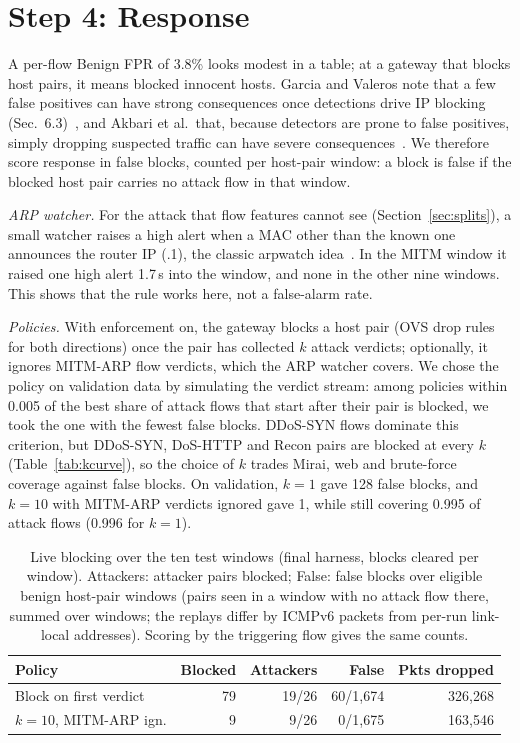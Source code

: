\section{Step 4: Response}\label{sec:response}

A per-flow Benign FPR of 3.8\% looks modest in a table; at a gateway that blocks host pairs, it means blocked innocent hosts. Garcia and Valeros note that a few false positives can have strong consequences once detections drive IP blocking (Sec.~6.3)~\cite{garcia2023labeling}, and Akbari et al.\ that, because detectors are prone to false positives, simply dropping suspected traffic can have severe consequences~\cite{akbari2020atmos}. We therefore score response in false blocks, counted per host-pair window: a block is false if the blocked host pair carries no attack flow in that window.

\emph{ARP watcher.} For the attack that flow features cannot see (Section~\ref{sec:splits}), a small watcher raises a high alert when a MAC other than the known one announces the router IP (.1), the classic arpwatch idea~\cite{arpwatch}. In the MITM window it raised one high alert 1.7\,s into the window, and none in the other nine windows. This shows that the rule works here, not a false-alarm rate.

\emph{Policies.} With enforcement on, the gateway blocks a host pair (OVS drop rules for both directions) once the pair has collected $k$ attack verdicts; optionally, it ignores MITM-ARP flow verdicts, which the ARP watcher covers. We chose the policy on validation data by simulating the verdict stream: among policies within 0.005 of the best share of attack flows that start after their pair is blocked, we took the one with the fewest false blocks. DDoS-SYN flows dominate this criterion, but DDoS-SYN, DoS-HTTP and Recon pairs are blocked at every $k$ (Table~\ref{tab:kcurve}), so the choice of $k$ trades Mirai, web and brute-force coverage against false blocks. On validation, $k=1$ gave 128 false blocks, and $k=10$ with MITM-ARP verdicts ignored gave 1, while still covering 0.995 of attack flows (0.996 for $k=1$).

\begin{table}[t]
\centering
\caption{Live blocking over the ten test windows (final harness, blocks cleared per window). Attackers: attacker pairs blocked; False: false blocks over eligible benign host-pair windows (pairs seen in a window with no attack flow there, summed over windows; the replays differ by ICMPv6 packets from per-run link-local addresses). Scoring by the triggering flow gives the same counts.}
\label{tab:blocking}
\footnotesize
\setlength{\tabcolsep}{3pt}
\begin{tabular}{lrrrr}
\hline
Policy & Blocked & Attackers & False & Pkts dropped \\
\hline
Block on first verdict & 79 & 19/26 & 60/1,674 & 326,268 \\
$k=10$, MITM-ARP ign. & 9 & 9/26 & 0/1,675 & 163,546 \\
\hline
\end{tabular}
\end{table}


